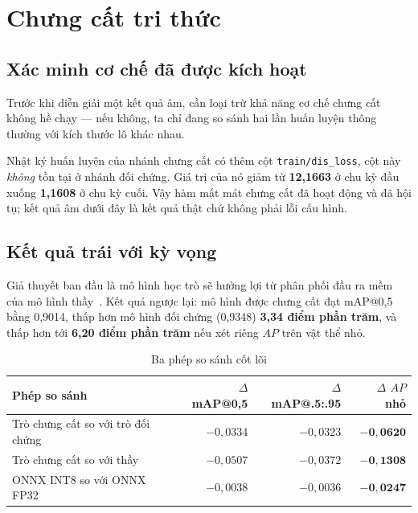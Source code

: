 \section{Chưng cất tri thức}

\subsection{Xác minh cơ chế đã được kích hoạt}

Trước khi diễn giải một kết quả âm, cần loại trừ khả năng cơ chế chưng cất không hề chạy --- nếu
không, ta chỉ đang so sánh hai lần huấn luyện thông thường với kích thước lô khác nhau.

Nhật ký huấn luyện của nhánh chưng cất có thêm cột \texttt{train/dis\_loss}, cột này \emph{không}
tồn tại ở nhánh đối chứng. Giá trị của nó giảm từ \textbf{12,1663} ở chu kỳ đầu xuống
\textbf{1,1608} ở chu kỳ cuối. Vậy hàm mất mát chưng cất đã hoạt động và đã hội tụ; kết quả âm dưới
đây là kết quả thật chứ không phải lỗi cấu hình.

\subsection{Kết quả trái với kỳ vọng}
\label{sec:trai_ky_vong}

Giả thuyết ban đầu là mô hình học trò sẽ hưởng lợi từ phân phối đầu ra mềm của mô hình
thầy~\cite{hinton2015distillation}. Kết quả ngược lại: mô hình được chưng cất đạt mAP@0,5 bằng
0,9014, thấp hơn mô hình đối chứng (0,9348) \textbf{3,34 điểm phần trăm}, và thấp hơn tới
\textbf{6,20 điểm phần trăm} nếu xét riêng $AP$ trên vật thể nhỏ.

\begin{table}[H]
\centering
\caption{Ba phép so sánh cốt lõi}
\label{tab:delta}
\small
\begin{tabular}{lrrr}
\toprule
\textbf{Phép so sánh} & \textbf{$\Delta$ mAP@0,5} & \textbf{$\Delta$ mAP@.5:.95} & \textbf{$\Delta$ $AP$ nhỏ} \\
\midrule
Trò chưng cất so với trò đối chứng & $-0{,}0334$ & $-0{,}0323$ & $\mathbf{-0{,}0620}$ \\
Trò chưng cất so với thầy          & $-0{,}0507$ & $-0{,}0372$ & $\mathbf{-0{,}1308}$ \\
ONNX INT8 so với ONNX FP32         & $-0{,}0038$ & $-0{,}0036$ & $\mathbf{-0{,}0247}$ \\
\bottomrule
\end{tabular}
\end{table}

